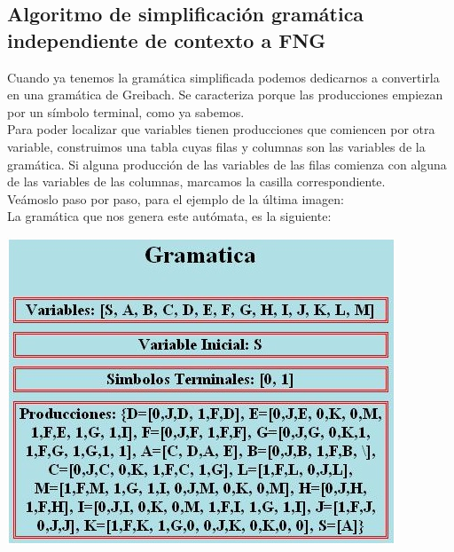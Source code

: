 \documentclass[12pt,a4paper,spanish]{book}
\begin{document}
\subsection{Algoritmo de simplificaci\'on gram\'atica independiente de contexto a FNG}
Cuando ya tenemos la gram\'atica simplificada podemos dedicarnos a convertirla en una gram\'atica de Greibach. Se caracteriza porque las producciones empiezan por un s\'imbolo terminal, como ya sabemos.\\ 
Para poder localizar que variables tienen producciones que comiencen por otra variable, construimos una tabla cuyas filas y columnas son las variables de la gram\'atica. Si alguna producci\'on de las variables de las filas comienza con alguna de las variables de las columnas, marcamos la casilla correspondiente.\\ 
Ve\'amoslo paso por paso, para el ejemplo de la \'ultima imagen:\\

La gram\'atica que nos genera este aut\'omata, es la siguiente:\\
\newline
\begin{center}
\includegraphics[scale=0.7]{gram1.jpg}
\end{center}
\end{document}

